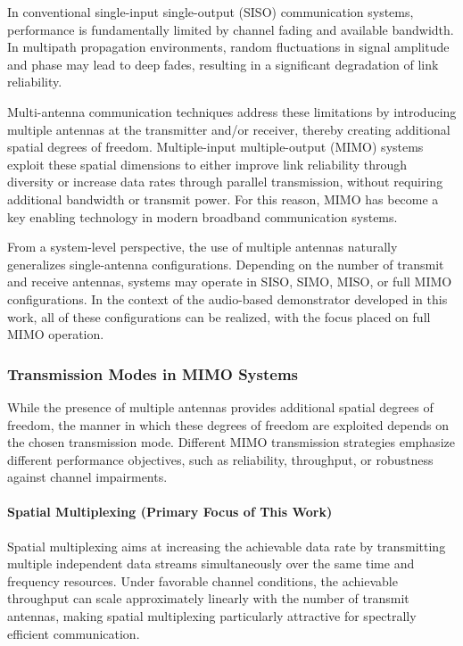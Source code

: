 In conventional single-input single-output (SISO) communication systems, performance is fundamentally limited by channel fading and available bandwidth. In multipath propagation environments, random fluctuations in signal amplitude and phase may lead to deep fades, resulting in a significant degradation of link reliability.

Multi-antenna communication techniques address these limitations by introducing multiple antennas at the transmitter and/or receiver, thereby creating additional spatial degrees of freedom. Multiple-input multiple-output (MIMO) systems exploit these spatial dimensions to either improve link reliability through diversity or increase data rates through parallel transmission, without requiring additional bandwidth or transmit power. For this reason, MIMO has become a key enabling technology in modern broadband communication systems.

From a system-level perspective, the use of multiple antennas naturally generalizes single-antenna configurations. Depending on the number of transmit and receive antennas, systems may operate in SISO, SIMO, MISO, or full MIMO configurations. In the context of the audio-based demonstrator developed in this work, all of these configurations can be realized, with the focus placed on full MIMO operation.

\subsubsection{Transmission Modes in MIMO Systems}

While the presence of multiple antennas provides additional spatial degrees of freedom, the manner in which these degrees of freedom are exploited depends on the chosen transmission mode. Different MIMO transmission strategies emphasize different performance objectives, such as reliability, throughput, or robustness against channel impairments.

\paragraph{Spatial Multiplexing (Primary Focus of This Work)}

Spatial multiplexing aims at increasing the achievable data rate by transmitting multiple independent data streams simultaneously over the same time and frequency resources. Under favorable channel conditions, the achievable throughput can scale approximately linearly with the number of transmit antennas, making spatial multiplexing particularly attractive for spectrally efficient communication.

